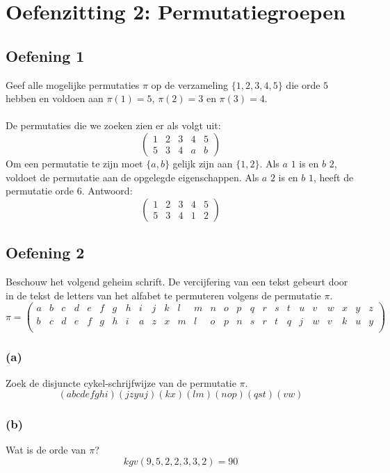 \documentclass[main.tex]{subfiles}
\begin{document}
\section{Oefenzitting 2: Permutatiegroepen}

\subsection*{Oefening 1}
\label{oza:oz2-oef1}
Geef alle mogelijke permutaties $\pi$ op de verzameling $\{1,2,3,4,5\}$ die orde $5$ hebben en voldoen aan $\pi(1) = 5$, $\pi(2) = 3$ en $\pi(3) = 4$.\\\\
De permutaties die we zoeken zien er als volgt uit:
\[
\begin{pmatrix}
  1 & 2 & 3 & 4 & 5\\
  5 & 3 & 4 & a & b
\end{pmatrix}
\] 
Om een permutatie te zijn moet $\{a,b\}$ gelijk zijn aan $\{1,2\}$.
Als $a$ $1$ is en $b$ $2$, voldoet de permutatie aan de opgelegde eigenschappen.
Als $a$ $2$ is en $b$ $1$, heeft de permutatie orde $6$.
Antwoord:
\[
\begin{pmatrix}
  1 & 2 & 3 & 4 & 5\\
  5 & 3 & 4 & 1 & 2
\end{pmatrix}
\] 

\subsection*{Oefening 2}
\label{oza:oz2-oef2}
Beschouw het volgend geheim schrift.
De vercijfering van een tekst gebeurt door in de tekst de letters van het alfabet te permuteren volgens de permutatie $\pi$.
\[
\pi =
\left(
\begin{array}{cccccccccccccccccccccccccc}
  a & b & c & d & e & f & g & h & i & j & k & l & m & n & o & p & q & r & s & t & u & v & w & x & y & z\\
  b & c & d & e & f & g & h & i & a & z & x & m & l & o & p & n & s & r & t & q & j & w & v & k & u & y\\ 
\end{array}
\right)
\]

\subsubsection*{(a)}
Zoek de disjuncte cykel-schrijfwijze van de permutatie $\pi$.
\[ (abcdefghi)(jzyuj)(kx)(lm)(nop)(qst)(vw) \] 

\subsubsection*{(b)}
Wat is de orde van $\pi$?
\[ kgv(9,5,2,2,3,3,2) = 90 \]
\end{document}
